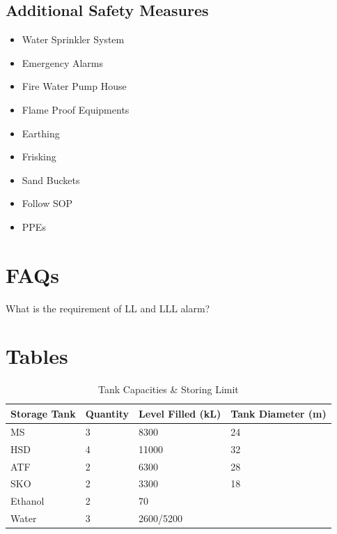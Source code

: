 \documentclass{report}
\begin{document}
	\subsection{Additional Safety Measures}
	\begin{itemize}
		\item Water Sprinkler System
		\item Emergency Alarms
		\item Fire Water Pump House
		\item Flame Proof Equipments
		\item Earthing
		\item Frisking
		\item Sand Buckets
		\item Follow SOP
		\item PPEs
	\end{itemize}
	\section{FAQs}
	\begin{description}
		\item[What is the requirement of LL and LLL alarm?] 
	\end{description}
	\clearpage
	\pagebreak
	\section{Tables}
	\begin{table}[h]
		\centering
		\begin{tabular}{@{}llll@{}}
			\toprule
			\textbf{Storage Tank} & \textbf{Quantity} & \textbf{Level Filled (kL)} & \textbf{Tank Diameter (m)} \\ \midrule
			MS                    & 3                 & 8300                       & 24                         \\
			HSD                   & 4                 & 11000                      & 32                         \\
			ATF                   & 2                 & 6300                       & 28                         \\
			SKO                   & 2                 & 3300                       & 18                         \\
			Ethanol               & 2                 & 70                         &                            \\
			Water                 & 3                 & 2600/5200                  &                            \\ \bottomrule
		\end{tabular}
	\caption{Tank Capacities \& Storing Limit}
	\label{bareja_tank_cap}
	\end{table}
	\clearpage
	\pagebreak
\end{document}
